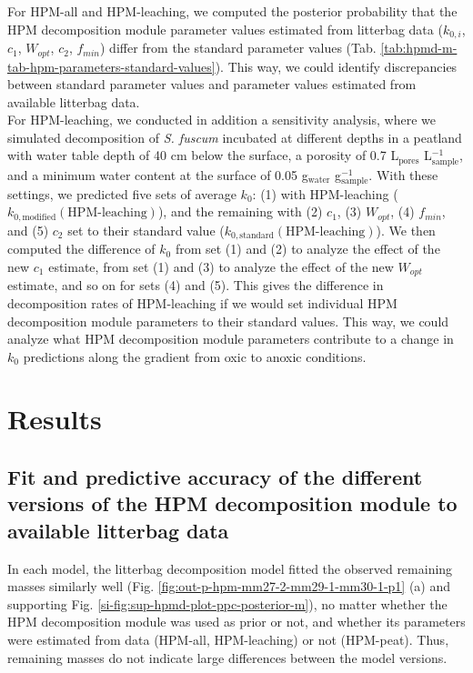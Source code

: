 \documentclass[esd, manuscript]{copernicus}
\begin{document}
For HPM-all and HPM-leaching, we computed the posterior probability that the HPM decomposition module parameter values estimated from litterbag data (\(k_{0,i}\), \(c_1\), \(W_{opt}\), \(c_2\), \(f_{min}\)) differ from the standard parameter values (Tab. \ref{tab:hpmd-m-tab-hpm-parameters-standard-values}). This way, we could identify discrepancies between standard parameter values and parameter values estimated from available litterbag data.\\
For HPM-leaching, we conducted in addition a sensitivity analysis, where we simulated decomposition of \emph{S. fuscum} incubated at different depths in a peatland with water table depth of 40 cm below the surface, a porosity of 0.7 L\(_\text{pores}\) L\(_\text{sample}^{-1}\), and a minimum water content at the surface of 0.05 g\(_\text{water}\) g\(_\text{sample}^{-1}\). With these settings, we predicted five sets of average \(k_0\): (1) with HPM-leaching (\(k_{0,\text{modified}}(\text{HPM-leaching})\)), and the remaining with (2) \(c_1\), (3) \(W_{opt}\), (4) \(f_{min}\), and (5) \(c_2\) set to their standard value (\(k_{0,\text{standard}}(\text{HPM-leaching})\)). We then computed the difference of \(k_0\) from set (1) and (2) to analyze the effect of the new \(c_1\) estimate, from set (1) and (3) to analyze the effect of the new \(W_{opt}\) estimate, and so on for sets (4) and (5). This gives the difference in decomposition rates of HPM-leaching if we would set individual HPM decomposition module parameters to their standard values. This way, we could analyze what HPM decomposition module parameters contribute to a change in \(k_0\) predictions along the gradient from oxic to anoxic conditions.

\section{Results}

\subsection{Fit and predictive accuracy of the different versions of the HPM decomposition module to available litterbag data}

In each model, the litterbag decomposition model fitted the observed remaining masses similarly well (Fig. \ref{fig:out-p-hpm-mm27-2-mm29-1-mm30-1-p1} (a) and supporting Fig. \ref{si-fig:sup-hpmd-plot-ppc-posterior-m}), no matter whether the HPM decomposition module was used as prior or not, and whether its parameters were estimated from data (HPM-all, HPM-leaching) or not (HPM-peat). Thus, remaining masses do not indicate large differences between the model versions.
\end{document}
